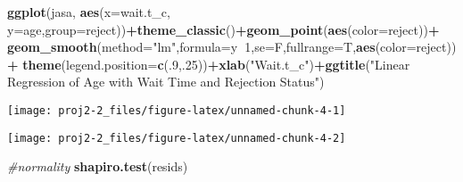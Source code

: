 \documentclass[]{article}
\newenvironment{Shaded}{\begin{snugshade}}{\end{snugshade}}
\newcommand{\CommentTok}[1]{\textcolor[rgb]{0.56,0.35,0.01}{\textit{#1}}}
\newcommand{\DataTypeTok}[1]{\textcolor[rgb]{0.13,0.29,0.53}{#1}}
\newcommand{\DecValTok}[1]{\textcolor[rgb]{0.00,0.00,0.81}{#1}}
\newcommand{\KeywordTok}[1]{\textcolor[rgb]{0.13,0.29,0.53}{\textbf{#1}}}
\newcommand{\NormalTok}[1]{#1}
\newcommand{\OperatorTok}[1]{\textcolor[rgb]{0.81,0.36,0.00}{\textbf{#1}}}
\newcommand{\StringTok}[1]{\textcolor[rgb]{0.31,0.60,0.02}{#1}}
\begin{document}
\begin{Shaded}
\begin{Highlighting}[]
\KeywordTok{ggplot}\NormalTok{(jasa, }\KeywordTok{aes}\NormalTok{(}\DataTypeTok{x=}\NormalTok{wait.t_c, }\DataTypeTok{y=}\NormalTok{age,}\DataTypeTok{group=}\NormalTok{reject))}\OperatorTok{+}\KeywordTok{theme_classic}\NormalTok{()}\OperatorTok{+}\KeywordTok{geom_point}\NormalTok{(}\KeywordTok{aes}\NormalTok{(}\DataTypeTok{color=}\NormalTok{reject))}\OperatorTok{+}
\StringTok{  }\KeywordTok{geom_smooth}\NormalTok{(}\DataTypeTok{method=}\StringTok{"lm"}\NormalTok{,}\DataTypeTok{formula=}\NormalTok{y}\OperatorTok{~}\DecValTok{1}\NormalTok{,}\DataTypeTok{se=}\NormalTok{F,}\DataTypeTok{fullrange=}\NormalTok{T,}\KeywordTok{aes}\NormalTok{(}\DataTypeTok{color=}\NormalTok{reject))}\OperatorTok{+}
\KeywordTok{theme}\NormalTok{(}\DataTypeTok{legend.position=}\KeywordTok{c}\NormalTok{(.}\DecValTok{9}\NormalTok{,.}\DecValTok{25}\NormalTok{))}\OperatorTok{+}\KeywordTok{xlab}\NormalTok{(}\StringTok{"Wait.t_c"}\NormalTok{)}\OperatorTok{+}\KeywordTok{ggtitle}\NormalTok{(}\StringTok{"Linear Regression of Age with Wait Time and Rejection Status"}\NormalTok{)}
\end{Highlighting}
\end{Shaded}

\begin{center}\texttt{[image: proj2-2\_files/figure-latex/unnamed-chunk-4-1]} \end{center}

\begin{Shaded}
\end{Shaded}

\begin{center}\texttt{[image: proj2-2\_files/figure-latex/unnamed-chunk-4-2]} \end{center}

\begin{Shaded}
\begin{Highlighting}[]
\CommentTok{#normality }
\KeywordTok{shapiro.test}\NormalTok{(resids)}
\end{Highlighting}
\end{Shaded}
\end{document}
